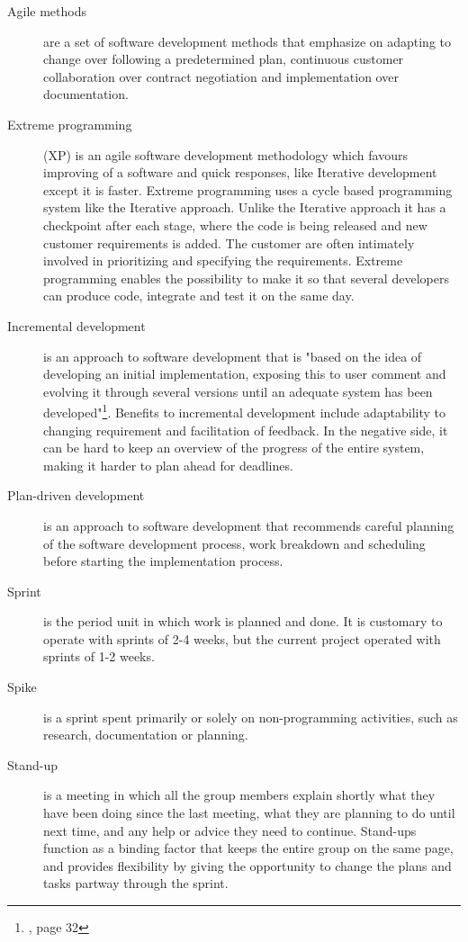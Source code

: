 \begin{description}

\item[Agile methods] \label{def:agile} are a set of software development methods that emphasize on adapting to change over following a predetermined plan, continuous customer collaboration over contract negotiation and implementation over documentation.

\item[Extreme programming] (XP) is an agile software development methodology which favours improving of a software and quick responses, like Iterative development except it is faster. Extreme programming uses a cycle based programming system like the Iterative approach. Unlike the Iterative approach it has a checkpoint after each stage, where the code is being released and new customer requirements is added. The customer are often intimately involved in prioritizing and specifying the requirements. Extreme programming enables the possibility to make it so that several developers can produce code, integrate and test it on the same day.  %

\item[Incremental development] \label{def:incrementalDev} is an approach to software development that is "based on the idea of developing an initial implementation, exposing this to user comment and evolving it through several versions until an adequate system has been developed"\footnote{\cite{sommerville}, page 32}. Benefits to incremental development include adaptability to changing requirement and facilitation of feedback. In the negative side, it can be hard to keep an overview of the progress of the entire system, making it harder to plan ahead for deadlines.

\item[Plan-driven development] \label{def:plan-driven} is an approach to software development that recommends careful planning of the software development process, work breakdown and scheduling before starting the implementation process. 

\item[Sprint] \label{def:sprint} is the period unit in which work is planned and done. It is customary to operate with sprints of 2-4 weeks, but the current project operated with sprints of 1-2 weeks.

\item[Spike] \label{def:spike} is a sprint spent primarily or solely on non-programming activities, such as research, documentation or planning.

\item[Stand-up] \label{def:dailyScrum} is a meeting in which all the group members explain shortly what they have been doing since the last meeting, what they are planning to do until next time, and any help or advice they need to continue. Stand-ups function as a binding factor that keeps the entire group on the same page, and provides flexibility by giving the opportunity to change the plans and tasks partway through the sprint.

\end{description}

